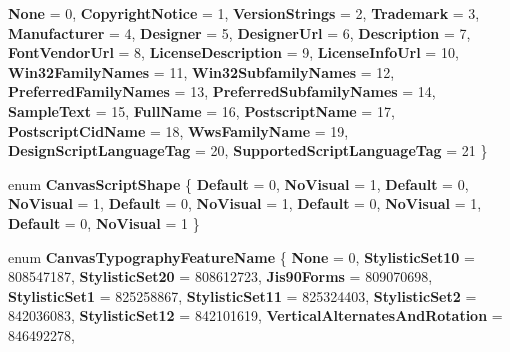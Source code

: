 \begin{DoxyCompactItemize}
\newline
{\bfseries None} = 0, 
{\bfseries Copyright\+Notice} = 1, 
{\bfseries Version\+Strings} = 2, 
{\bfseries Trademark} = 3, 
\newline
{\bfseries Manufacturer} = 4, 
{\bfseries Designer} = 5, 
{\bfseries Designer\+Url} = 6, 
{\bfseries Description} = 7, 
\newline
{\bfseries Font\+Vendor\+Url} = 8, 
{\bfseries License\+Description} = 9, 
{\bfseries License\+Info\+Url} = 10, 
{\bfseries Win32\+Family\+Names} = 11, 
\newline
{\bfseries Win32\+Subfamily\+Names} = 12, 
{\bfseries Preferred\+Family\+Names} = 13, 
{\bfseries Preferred\+Subfamily\+Names} = 14, 
{\bfseries Sample\+Text} = 15, 
\newline
{\bfseries Full\+Name} = 16, 
{\bfseries Postscript\+Name} = 17, 
{\bfseries Postscript\+Cid\+Name} = 18, 
{\bfseries Wws\+Family\+Name} = 19, 
\newline
{\bfseries Design\+Script\+Language\+Tag} = 20, 
{\bfseries Supported\+Script\+Language\+Tag} = 21
 \}
\item 
\mbox{\label{namespace_microsoft_1_1_graphics_1_1_canvas_1_1_text_a384b9463c1092502564c5ab676b2de09}} 
enum {\bfseries Canvas\+Script\+Shape} \{ \newline
{\bfseries Default} = 0, 
{\bfseries No\+Visual} = 1, 
{\bfseries Default} = 0, 
{\bfseries No\+Visual} = 1, 
\newline
{\bfseries Default} = 0, 
{\bfseries No\+Visual} = 1, 
{\bfseries Default} = 0, 
{\bfseries No\+Visual} = 1, 
\newline
{\bfseries Default} = 0, 
{\bfseries No\+Visual} = 1
 \}
\item 
\mbox{\label{namespace_microsoft_1_1_graphics_1_1_canvas_1_1_text_a0b3acf542d0a5a81f48cf181f63ab6d7}} 
enum {\bfseries Canvas\+Typography\+Feature\+Name} \{ \newline
{\bfseries None} = 0, 
{\bfseries Stylistic\+Set10} = 808547187, 
{\bfseries Stylistic\+Set20} = 808612723, 
{\bfseries Jis90\+Forms} = 809070698, 
\newline
{\bfseries Stylistic\+Set1} = 825258867, 
{\bfseries Stylistic\+Set11} = 825324403, 
{\bfseries Stylistic\+Set2} = 842036083, 
{\bfseries Stylistic\+Set12} = 842101619, 
\newline
{\bfseries Vertical\+Alternates\+And\+Rotation} = 846492278, 

\end{DoxyCompactItemize}
